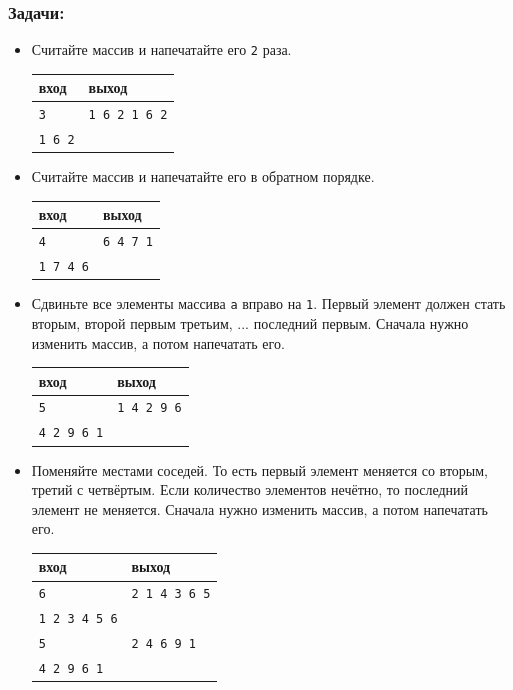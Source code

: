 \documentclass{article}
\begin{document}
\subsubsection*{Задачи:}
\begin{itemize}
\item Считайте массив и напечатайте его \texttt{2} раза.
\begin{center}
\begin{tabular}{ l | l }
 вход & выход \\ \hline
 \texttt{3} & \texttt{1 6 2 1 6 2}  \\ 
 \texttt{1 6 2} &   \\
\end{tabular}
\end{center}
\item Считайте массив и напечатайте его в обратном порядке.
\begin{center}
\begin{tabular}{ l | l }
 вход & выход \\ \hline
 \texttt{4} & \texttt{6 4 7 1}  \\ 
 \texttt{1 7 4 6} &   \\
\end{tabular}
\end{center}
\item Сдвиньте все элементы массива \texttt{a} вправо на \texttt{1}. Первый элемент должен стать вторым, второй первым третьим, ... последний первым. Сначала нужно изменить массив, а потом напечатать его.
\begin{center}
\begin{tabular}{ l | l }
 вход & выход \\ \hline
 \texttt{5} & \texttt{1 4 2 9 6}  \\ 
 \texttt{4 2 9 6 1} &   \\
\end{tabular}
\end{center}

\item Поменяйте местами соседей. То есть первый элемент меняется со вторым, третий с четвёртым. Если количество элементов нечётно, то последний элемент не меняется. Сначала нужно изменить массив, а потом напечатать его.
\begin{center}
\begin{tabular}{ l | l }
 вход & выход \\ \hline
 \texttt{6} & \texttt{2 1 4 3 6 5}  \\ 
 \texttt{1 2 3 4 5 6} &   \\ \hline
 \texttt{5} & \texttt{2 4 6 9 1}  \\ 
 \texttt{4 2 9 6 1} &   \\
\end{tabular}
\end{center}


\end{itemize}
\end{document}
